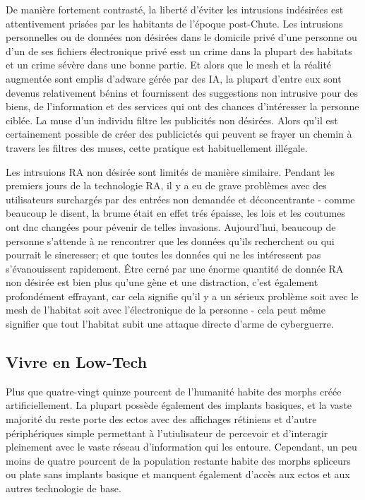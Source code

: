 De manière fortement contrasté, la liberté d'éviter les intrusions indésirées est attentivement prisées par les habitants de l'époque post-Chute. Les intrusions personnelles ou de données non désirées dans le domicile privé d'une personne ou d'un de ses fichiers électronique privé esst un crime dans la plupart des habitats et un crime sévère dans une bonne partie. Et alors que le mesh et la réalité augmentée sont emplis d'adware gérée par des IA, la plupart d'entre eux sont devenus relativement bénins et fournissent des suggestions non intrusive pour des biens, de l'information et des services qui ont des chances d'intéresser la personne ciblée. La muse d'un individu filtre les publicités non désirées. Alors qu'il est certainement possible de créer des publicictés qui peuvent se frayer un chemin à travers les filtres des muses, cette pratique est habituellement illégale. 

Les intrsuions RA non désirée sont limités de manière similaire. Pendant les premiers jours de la technologie RA, il y a eu de grave problèmes avec des utilisateurs surchargés par des entrées non demandée et déconcentrante - comme beaucoup le disent, la brume était en effet trés épaisse, les lois et les coutumes ont dnc changées pour pévenir de telles invasions. Aujourd'hui, beaucoup de personne s'attende à ne rencontrer que les données qu'ils recherchent ou qui pourrait le sineresser; et que toutes les données qui ne les intéressent pas s'évanouissent rapidement. Être cerné par une énorme quantité de donnée RA non désirée est bien plus qu'une gène et une distraction, c'est également profondément effrayant, car cela signifie qu'il y a un sérieux problème soit avec le mesh de l'habitat soit avec l'électronique de la personne - cela peut même signifier que tout l'habitat subit une attaque directe d'arme de cyberguerre. 

\subsection{Vivre en Low-Tech} \label{sec:low-tech-existence} 

Plus que quatre-vingt quinze pourcent de l'humanité habite des morphs créée artificiellement. La plupart possède également des implants basiques, et la vaste majorité du reste porte des ectos avec des affichages rétiniens et d'autre périphériques simple permettant à l'utiulisateur de percevoir et d'interagir pleinement avec le vaste réseau d'information qui les entoure. Cependant, un peu moins de quatre pourcent de la population restante habite des morphs spliceurs ou plate sans implants basique et manquent également d'accès aux ectos et aux autres technologie de base. 

